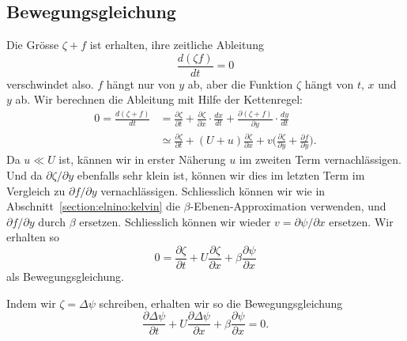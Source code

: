 \subsection{Bewegungsgleichung\label{subsection:rossby:bewegungsgleichung}}
Die Grösse $\zeta+f$ ist erhalten, ihre zeitliche Ableitung
\[
\frac{d(\zeta f)}{dt}=0
\]
verschwindet also.
$f$ hängt nur von $y$ ab, aber die Funktion $\zeta$ hängt von $t$,
$x$ und $y$ ab.
Wir berechnen die Ableitung mit Hilfe der Kettenregel:
\begin{align*}
0
=
\frac{d(\zeta+f)}{dt}
&=
\frac{\partial\zeta}{\partial t}
+
\frac{\partial\zeta}{\partial x}\cdot \frac{dx}{dt}
+
\frac{\partial(\zeta+f)}{\partial y}\cdot\frac{dy}{dt}
\\
&\simeq
\frac{\partial\zeta}{\partial t}
+
(U+u)\frac{\partial\zeta}{\partial x}
+
v\biggl(\frac{\partial\zeta}{\partial y} + \frac{\partial f}{\partial y}\biggr).
\end{align*}
Da $u\ll U$ ist, kännen wir in erster Näherung $u$ im zweiten Term 
vernachlässigen.
Und da $\partial\zeta/\partial y$ ebenfalls sehr klein ist, können
wir dies im letzten Term im Vergleich zu $\partial f/\partial y$
vernachlässigen.
Schliesslich können wir wie in Abschnitt~\ref{section:elnino:kelvin}
die $\beta$-Ebenen-Approximation verwenden, und $\partial f/\partial y$
durch $\beta$ ersetzen.
Schliesslich können wir wieder $v=\partial\psi/\partial x$ ersetzen.
Wir erhalten so
\[
0
=
\frac{\partial\zeta}{\partial t}
+
U\frac{\partial\zeta}{\partial x}
+
\beta\frac{\partial\psi}{\partial x}
\]
als Bewegungsgleichung.

Indem wir $\zeta=\Delta \psi$ schreiben, erhalten wir so die 
Bewegungsgleichung
\begin{equation}
\frac{\partial\Delta\psi}{\partial t}
+
U\frac{\partial\Delta\psi}{\partial x}
+
\beta\frac{\partial\psi}{\partial x}
=
0.
\label{rossby:gleichung}
\end{equation}


